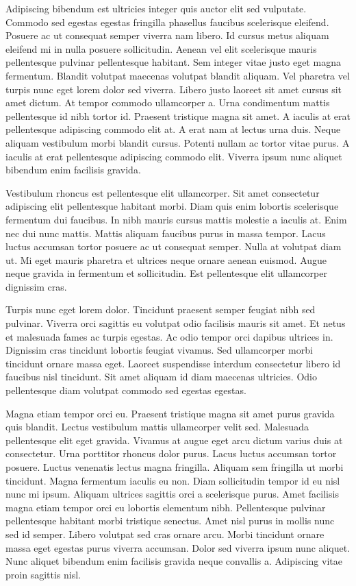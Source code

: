 \documentclass[11pt,a4paper]{article}
\begin{document}
Adipiscing bibendum est ultricies integer quis auctor elit sed vulputate. Commodo sed egestas egestas fringilla phasellus faucibus scelerisque eleifend. Posuere ac ut consequat semper viverra nam libero. Id cursus metus aliquam eleifend mi in nulla posuere sollicitudin. Aenean vel elit scelerisque mauris pellentesque pulvinar pellentesque habitant. Sem integer vitae justo eget magna fermentum. Blandit volutpat maecenas volutpat blandit aliquam. Vel pharetra vel turpis nunc eget lorem dolor sed viverra. Libero justo laoreet sit amet cursus sit amet dictum. At tempor commodo ullamcorper a. Urna condimentum mattis pellentesque id nibh tortor id. Praesent tristique magna sit amet. A iaculis at erat pellentesque adipiscing commodo elit at. A erat nam at lectus urna duis. Neque aliquam vestibulum morbi blandit cursus. Potenti nullam ac tortor vitae purus. A iaculis at erat pellentesque adipiscing commodo elit. Viverra ipsum nunc aliquet bibendum enim facilisis gravida.

Vestibulum rhoncus est pellentesque elit ullamcorper. Sit amet consectetur adipiscing elit pellentesque habitant morbi. Diam quis enim lobortis scelerisque fermentum dui faucibus. In nibh mauris cursus mattis molestie a iaculis at. Enim nec dui nunc mattis. Mattis aliquam faucibus purus in massa tempor. Lacus luctus accumsan tortor posuere ac ut consequat semper. Nulla at volutpat diam ut. Mi eget mauris pharetra et ultrices neque ornare aenean euismod. Augue neque gravida in fermentum et sollicitudin. Est pellentesque elit ullamcorper dignissim cras.

Turpis nunc eget lorem dolor. Tincidunt praesent semper feugiat nibh sed pulvinar. Viverra orci sagittis eu volutpat odio facilisis mauris sit amet. Et netus et malesuada fames ac turpis egestas. Ac odio tempor orci dapibus ultrices in. Dignissim cras tincidunt lobortis feugiat vivamus. Sed ullamcorper morbi tincidunt ornare massa eget. Laoreet suspendisse interdum consectetur libero id faucibus nisl tincidunt. Sit amet aliquam id diam maecenas ultricies. Odio pellentesque diam volutpat commodo sed egestas egestas.

Magna etiam tempor orci eu. Praesent tristique magna sit amet purus gravida quis blandit. Lectus vestibulum mattis ullamcorper velit sed. Malesuada pellentesque elit eget gravida. Vivamus at augue eget arcu dictum varius duis at consectetur. Urna porttitor rhoncus dolor purus. Lacus luctus accumsan tortor posuere. Luctus venenatis lectus magna fringilla. Aliquam sem fringilla ut morbi tincidunt. Magna fermentum iaculis eu non. Diam sollicitudin tempor id eu nisl nunc mi ipsum. Aliquam ultrices sagittis orci a scelerisque purus. Amet facilisis magna etiam tempor orci eu lobortis elementum nibh. Pellentesque pulvinar pellentesque habitant morbi tristique senectus. Amet nisl purus in mollis nunc sed id semper. Libero volutpat sed cras ornare arcu. Morbi tincidunt ornare massa eget egestas purus viverra accumsan. Dolor sed viverra ipsum nunc aliquet. Nunc aliquet bibendum enim facilisis gravida neque convallis a. Adipiscing vitae proin sagittis nisl.
\end{document}
